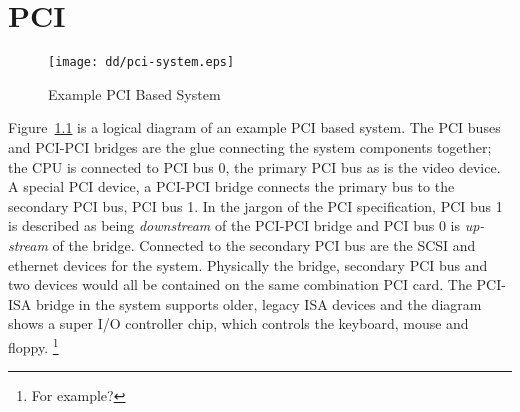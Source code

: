 %
%
%
%
%
%
%
%
\newcommand{\bridgeN}[1]{\(Bridge_{#1}\)}
%
%
%
\chapter{PCI}
\label{PCI-chapter}

\begin{figure}
\begin{center}
{\centering \texttt{[image: dd/pci-system.eps]} \par}
\end{center}
\caption{Example PCI Based System}
\label{example-pci-system}
\end{figure}
Figure~\ref{example-pci-system} is a logical diagram of an example PCI based system.
The PCI buses and PCI-PCI bridges are the glue connecting the system
components together; the CPU 
is connected to PCI bus 0, the primary PCI bus as is the video device.  
A special PCI device, a PCI-PCI bridge connects the primary
bus to the secondary PCI bus, PCI bus 1. 
In the jargon of the PCI specification, PCI bus 1 is described as being 
{\em downstream} of the PCI-PCI bridge and
PCI bus 0 is {\em up-stream} of the bridge.
Connected to the secondary PCI bus are the SCSI and ethernet
devices for the system.
Physically the bridge, secondary PCI bus and two devices
would all be contained on the same combination PCI card.
The PCI-ISA bridge in the system supports older, legacy ISA devices and the diagram
shows a super I/O controller chip, which controls the keyboard, mouse and
floppy.
\footnote{For example?}

